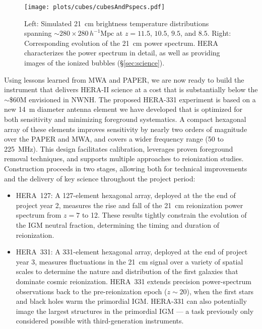 \documentclass[preprint]{aastex}
\newcommand{\Caption}[4]{\vspace{#1}\renewcommand{\baselinestretch}{#2}\caption{#4}\vspace{#3}}
\begin{document}
\begin{figure}[t]\centering
\texttt{[image: plots/cubes/cubesAndPspecs.pdf]}
\Caption{-0.2in}{0.99}{-0.1in}{\small 
Left: Simulated 21~cm brightness temperature distributions spanning $\sim 280 \times 280\,h^{-1}\textrm{Mpc}$
at $z=11.5$, $10.5$, $9.5$, and $8.5$.
Right: Corresponding evolution of the 21~cm power spectrum.  HERA
characterizes the power spectrum in detail, as well as
providing images of the ionized bubbles (\S\ref{sec:science}).}
\label{fig:EoRsims} \end{figure}

Using lessons learned from MWA and PAPER, 
we are now ready to build the instrument
that delivers HERA-II science at a cost that is substantially below the $\sim$\$60M envisioned in NWNH.
The proposed HERA-331 experiment is based on
a new 14~m diameter antenna element we have developed that is
optimized for both sensitivity and minimizing foreground systematics.  
A compact hexagonal array of these elements 
improves sensitivity by nearly two orders of magnitude 
over the PAPER and MWA, and covers a wider frequency range (50 to 225~MHz).
This design facilitates calibration, leverages proven foreground removal techniques, and supports
multiple approaches to reionization studies. 
Construction proceeds in two stages, allowing both for technical improvements and the delivery of 
key science throughout the project period: 

\begin{itemize}[noitemsep,nolistsep]

\item HERA~127: A 127-element hexagonal array, deployed at the
the end of project year 2, measures the rise and fall of the
21~cm reionization power spectrum from $z = 7$ to 12. These results tightly
constrain the evolution of the IGM neutral fraction, determining
the timing and duration of reionization. %

\item HERA~331: A 331-element hexagonal array, deployed at the end of project year 3,
measures fluctuations in the 21~cm signal over a variety of spatial
scales to determine the nature and distribution of the first galaxies
that dominate cosmic reionization. HERA~331 extends precision
power-spectrum observations back to the pre-reionization epoch ($z \sim 20$), 
when the first stars and black holes warm the primordial IGM. HERA-331 can also potentially 
image the largest structures in the primordial
IGM --- a task previously only considered possible with third-generation
instruments. 

\end{itemize}
\end{document}
